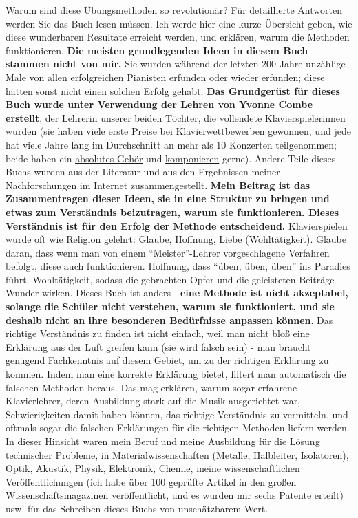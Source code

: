 Warum sind diese Übungsmethoden so revolutionär?
Für detaillierte Antworten werden Sie das Buch lesen müssen.
Ich werde hier eine kurze Übersicht geben, wie diese wunderbaren Resultate erreicht werden, und erklären, warum die Methoden funktionieren.
\textbf{Die meisten grundlegenden Ideen in diesem Buch stammen nicht von mir.}
Sie wurden während der letzten 200 Jahre unzählige Male von allen erfolgreichen Pianisten erfunden oder wieder erfunden; diese hätten sonst nicht einen solchen Erfolg gehabt.
\textbf{Das Grundgerüst für dieses Buch wurde unter Verwendung der Lehren von Yvonne Combe erstellt}, der Lehrerin unserer beiden Töchter, die vollendete Klavierspielerinnen wurden (sie haben viele erste Preise bei Klavierwettbewerben gewonnen, und jede hat viele Jahre lang im Durchschnitt an mehr als 10 Konzerten teilgenommen; beide haben ein \hyperref[c1iii12]{absolutes Gehör} und \hyperref[c1iii12blatt]{komponieren} gerne).
Andere Teile dieses Buchs wurden aus der Literatur und aus den Ergebnissen meiner Nachforschungen im Internet zusammengestellt.
\textbf{Mein Beitrag ist das Zusammentragen dieser Ideen, sie in eine Struktur zu bringen und etwas zum Verständnis beizutragen, warum sie funktionieren.
Dieses Verständnis ist für den Erfolg der Methode entscheidend.}
Klavierspielen wurde oft wie Religion gelehrt: Glaube, Hoffnung, Liebe (Wohltätigkeit).
Glaube daran, dass wenn man von einem \enquote{Meister}-Lehrer vorgeschlagene Verfahren befolgt, diese auch funktionieren.
Hoffnung, dass \enquote{üben, üben, üben} ins Paradies führt.
Wohltätigkeit, sodass die gebrachten Opfer und die geleisteten Beiträge Wunder wirken.
Dieses Buch ist anders - \textbf{eine Methode ist nicht akzeptabel, solange die Schüler nicht verstehen, warum sie funktioniert, und sie deshalb nicht an ihre besonderen Bedürfnisse anpassen können}.
Das richtige Verständnis zu finden ist nicht einfach, weil man nicht bloß eine Erklärung aus der Luft greifen kann (sie wird falsch sein) - man braucht genügend Fachkenntnis auf diesem Gebiet, um zu der richtigen Erklärung zu kommen.
Indem man eine korrekte Erklärung bietet, filtert man automatisch die falschen Methoden heraus.
Das mag erklären, warum sogar erfahrene Klavierlehrer, deren Ausbildung stark auf die Musik ausgerichtet war, Schwierigkeiten damit haben können, das richtige Verständnis zu vermitteln, und oftmals sogar die falschen Erklärungen für die richtigen Methoden liefern werden.
In dieser Hinsicht waren mein Beruf und meine Ausbildung für die Lösung technischer Probleme, in Materialwissenschaften (Metalle, Halbleiter, Isolatoren), Optik, Akustik, Physik, Elektronik, Chemie, meine wissenschaftlichen Veröffentlichungen (ich habe über 100 geprüfte Artikel in den großen Wissenschaftsmagazinen veröffentlicht, und es wurden mir sechs Patente erteilt) usw. für das Schreiben dieses Buchs von unschätzbarem Wert.
